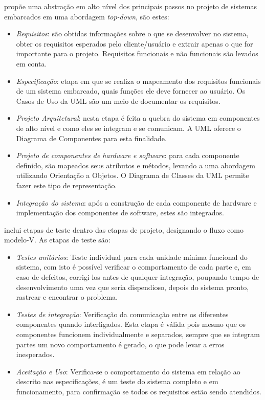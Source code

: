 \textcite{Wolf:2001} propõe uma abstração em alto nível dos principais passos no projeto de sistemas embarcados em uma abordagem \textit{top-down}, são estes:

\begin{itemize}
	\item \emph{Requisitos}: são obtidas informações sobre o que se desenvolver no sistema, obter os requisitos esperados pelo cliente/usuário e extrair apenas o que for importante para o projeto. Requisitos funcionais e não funcionais são levados em conta.
	\item \emph{Especificação}: etapa em que se realiza o mapeamento dos requisitos funcionais de um sistema embarcado, quais funções ele deve fornecer ao usuário. Os Casos de Uso da UML são um meio de documentar os requisitos.
	\item \emph{Projeto Arquitetural}: nesta etapa é feita a quebra do sistema em componentes de alto nível e como eles se integram e se comunicam. A UML oferece o Diagrama de Componentes para esta finalidade.
	\item \emph{Projeto de componentes de hardware e software}: para cada componente definido, são mapeados seus atributos e métodos, levando a uma abordagem utilizando Orientação a Objetos. O Diagrama de Classes da UML permite fazer este tipo de representação.
	 \item \emph{Integração do sistema}: após a construção de cada componente de hardware e implementação dos componentes de software, estes são integrados.
\end{itemize}
\textcite{Marwedel:2001}  inclui etapas de teste dentro das etapas de projeto, designando o fluxo como modelo-V. As etapas de teste são: 

\begin{itemize}
	\item \emph{Testes unitários}: Teste individual para cada unidade mínima funcional do sistema, com isto é possível verificar o comportamento de cada parte e, em caso de defeitos, corrigi-los antes de qualquer integração, poupando tempo de desenvolvimento uma vez que seria dispendioso, depois do sistema pronto, rastrear e encontrar o problema.
	\item \emph{Testes de integração}: Verificação da comunicação entre os diferentes componentes quando interligados. Esta etapa é válida pois mesmo que os componentes funcionem individualmente e separados, sempre que se integram partes um novo comportamento é gerado, o que pode levar a erros inesperados.
	\item \emph{Aceitação e Uso}: Verifica-se o comportamento do sistema em relação ao descrito nas especificações, é um teste do sistema completo e em funcionamento, para confirmação se todos os requisitos estão sendo atendidos.
\end{itemize}


